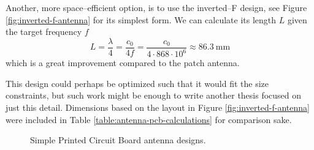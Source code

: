 Another, more space--efficient option, is to use the inverted--F design, see Figure \ref{fig:inverted-f-antenna} for its simplest form. We can calculate its length $L$ given the target frequency $f$
\begin{equation}
    L = \dfrac{\lambda}{4} = \dfrac{c_0}{4f} = \dfrac{c_0}{4 \cdot 868 \cdot 10^6} \approx 86.3~\mathrm{mm}
\end{equation}
which is a great improvement compared to the patch antenna.

This design could perhaps be optimized such that it would fit the size constraints, but such work might be enough to write another thesis focused on just this detail. Dimensions based on the layout in Figure \ref{fig:inverted-f-antenna} were included in Table \ref{table:antenna-pcb-calculations} for comparison sake.

\begin{figure}
    \centering
    \hfill
    \caption{Simple Printed Circuit Board antenna designs.}
\end{figure}

